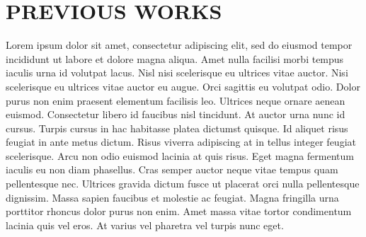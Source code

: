 \chapter{PREVIOUS WORKS}

Lorem ipsum dolor sit amet, consectetur adipiscing elit, sed do eiusmod tempor incididunt ut labore et dolore magna aliqua. Amet nulla facilisi morbi tempus iaculis urna id volutpat lacus. Nisl nisi scelerisque eu ultrices vitae auctor. Nisi scelerisque eu ultrices vitae auctor eu augue. Orci sagittis eu volutpat odio. Dolor purus non enim praesent elementum facilisis leo. Ultrices neque ornare aenean euismod. Consectetur libero id faucibus nisl tincidunt. At auctor urna nunc id cursus. Turpis cursus in hac habitasse platea dictumst quisque. Id aliquet risus feugiat in ante metus dictum. Risus viverra adipiscing at in tellus integer feugiat scelerisque. Arcu non odio euismod lacinia at quis risus. Eget magna fermentum iaculis eu non diam phasellus. Cras semper auctor neque vitae tempus quam pellentesque nec. Ultrices gravida dictum fusce ut placerat orci nulla pellentesque dignissim. Massa sapien faucibus et molestie ac feugiat. Magna fringilla urna porttitor rhoncus dolor purus non enim. Amet massa vitae tortor condimentum lacinia quis vel eros. At varius vel pharetra vel turpis nunc eget.
